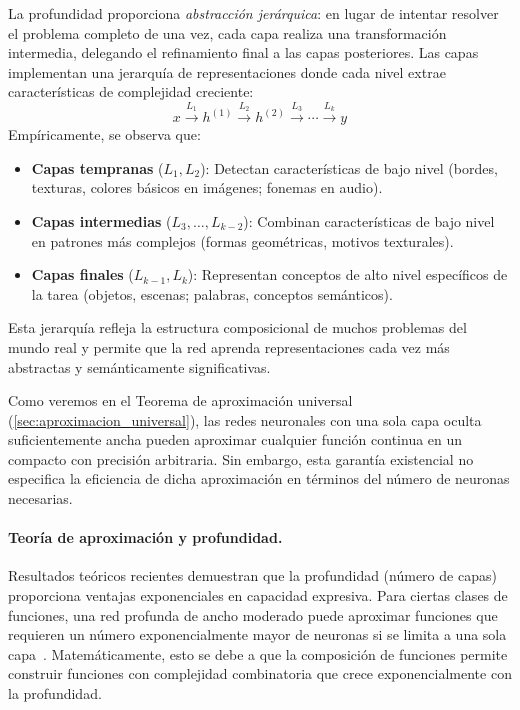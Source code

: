 La profundidad proporciona \textit{abstracción jerárquica}: en lugar de intentar resolver el problema completo de una vez, cada capa realiza una transformación intermedia, delegando el refinamiento final a las capas posteriores. Las capas implementan una jerarquía de representaciones donde cada nivel extrae características de complejidad creciente:
\[
x \xrightarrow{L_1} h^{(1)} \xrightarrow{L_2} h^{(2)} \xrightarrow{L_3} \cdots \xrightarrow{L_k} y
\]
Empíricamente, se observa que:
\begin{itemize}
    \item \textbf{Capas tempranas} ($L_1, L_2$): Detectan características de bajo nivel (bordes, texturas, colores básicos en imágenes; fonemas en audio).
    \item \textbf{Capas intermedias} ($L_3, \ldots, L_{k-2}$): Combinan características de bajo nivel en patrones más complejos (formas geométricas, motivos texturales).
    \item \textbf{Capas finales} ($L_{k-1}, L_k$): Representan conceptos de alto nivel específicos de la tarea (objetos, escenas; palabras, conceptos semánticos).
\end{itemize}
Esta jerarquía refleja la estructura composicional de muchos problemas del mundo real y permite que la red aprenda representaciones cada vez más abstractas y semánticamente significativas.

Como veremos en el Teorema de aproximación universal (\autoref{sec:aproximacion_universal}), las redes neuronales con una sola capa oculta suficientemente ancha pueden aproximar cualquier función continua en un compacto con precisión arbitraria. Sin embargo, esta garantía existencial no especifica la eficiencia de dicha aproximación en términos del número de neuronas necesarias.

\paragraph{Teoría de aproximación y profundidad.}

Resultados teóricos recientes demuestran que la profundidad (número de capas) proporciona ventajas exponenciales en capacidad expresiva. Para ciertas clases de funciones, una red profunda de ancho moderado puede aproximar funciones que requieren un número exponencialmente mayor de neuronas si se limita a una sola capa~\citep{telgarsky2016benefitsdepthneuralnetworks}. Matemáticamente, esto se debe a que la composición de funciones permite construir funciones con complejidad combinatoria que crece exponencialmente con la profundidad.

